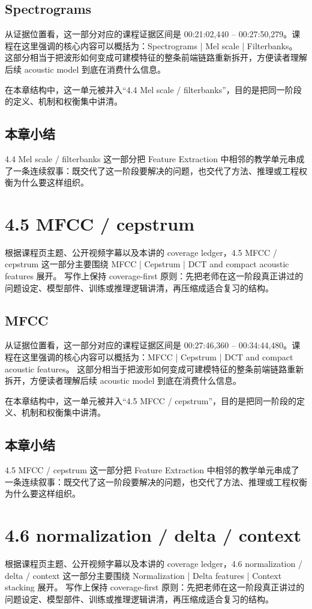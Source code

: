 \documentclass[a4paper]{article}
\begin{document}
\subsection{Spectrograms}
从证据位置看，这一部分对应的课程证据区间是 00:21:02,440 -- 00:27:50,279。课程在这里强调的核心内容可以概括为：Spectrograms | Mel scale | Filterbanks。
这部分相当于把波形如何变成可建模特征的整条前端链路重新拆开，方便读者理解后续 acoustic model 到底在消费什么信息。

在本章结构中，这一单元被并入“4.4 Mel scale / filterbanks”，目的是把同一阶段的定义、机制和权衡集中讲清。

\subsection{本章小结}
4.4 Mel scale / filterbanks 这一部分把 Feature Extraction 中相邻的教学单元串成了一条连续叙事：既交代了这一阶段要解决的问题，也交代了方法、推理或工程权衡为什么要这样组织。

\section{4.5 MFCC / cepstrum}
根据课程页主题、公开视频字幕以及本讲的 coverage ledger，4.5 MFCC / cepstrum 这一部分主要围绕 MFCC | Cepstrum | DCT and compact acoustic features 展开。
写作上保持 coverage-first 原则：先把老师在这一阶段真正讲过的问题设定、模型部件、训练或推理逻辑讲清，再压缩成适合复习的结构。

\subsection{MFCC}
从证据位置看，这一部分对应的课程证据区间是 00:27:46,360 -- 00:34:44,480。课程在这里强调的核心内容可以概括为：MFCC | Cepstrum | DCT and compact acoustic features。
这部分相当于把波形如何变成可建模特征的整条前端链路重新拆开，方便读者理解后续 acoustic model 到底在消费什么信息。

在本章结构中，这一单元被并入“4.5 MFCC / cepstrum”，目的是把同一阶段的定义、机制和权衡集中讲清。

\subsection{本章小结}
4.5 MFCC / cepstrum 这一部分把 Feature Extraction 中相邻的教学单元串成了一条连续叙事：既交代了这一阶段要解决的问题，也交代了方法、推理或工程权衡为什么要这样组织。

\section{4.6 normalization / delta / context}
根据课程页主题、公开视频字幕以及本讲的 coverage ledger，4.6 normalization / delta / context 这一部分主要围绕 Normalization | Delta features | Context stacking 展开。
写作上保持 coverage-first 原则：先把老师在这一阶段真正讲过的问题设定、模型部件、训练或推理逻辑讲清，再压缩成适合复习的结构。
\end{document}
